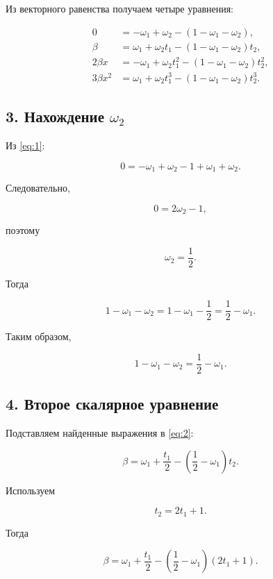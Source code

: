 \documentclass[a4paper,12pt]{article}
\begin{document}
	Из векторного равенства получаем четыре уравнения:
	
	\begin{align}
		0
		&=
		-\omega_1+\omega_2-(1-\omega_1-\omega_2),
		\label{eq:1}\\
		\beta
		&=
		\omega_1+\omega_2t_1
		-(1-\omega_1-\omega_2)t_2,
		\label{eq:2}\\
		2\beta x
		&=
		-\omega_1+\omega_2t_1^2
		-(1-\omega_1-\omega_2)t_2^2,
		\label{eq:3}\\
		3\beta x^2
		&=
		\omega_1+\omega_2t_1^3
		-(1-\omega_1-\omega_2)t_2^3.
		\label{eq:4}
	\end{align}
	
	\subsection*{3. Нахождение $\omega_2$}
	
	Из \eqref{eq:1}:
	
	\[
	0
	=
	-\omega_1+\omega_2-1+\omega_1+\omega_2.
	\]
	
	Следовательно,
	
	\[
	0=2\omega_2-1,
	\]
	
	поэтому
	
	\begin{equation}
		\boxed{\omega_2=\frac12}.
	\end{equation}
	
	Тогда
	
	\[
	1-\omega_1-\omega_2
	=
	1-\omega_1-\frac12
	=
	\frac12-\omega_1.
	\]
	
	Таким образом,
	
	\begin{equation}
		\boxed{
			1-\omega_1-\omega_2
			=
			\frac12-\omega_1.
		}
	\end{equation}
	
	\subsection*{4. Второе скалярное уравнение}
	
	Подставляем найденные выражения в \eqref{eq:2}:
	
	\[
	\beta
	=
	\omega_1+\frac{t_1}{2}
	-
	\left(\frac12-\omega_1\right)t_2.
	\]
	
	Используем
	
	\[
	t_2=2t_1+1.
	\]
	
	Тогда
	
	\[
	\beta
	=
	\omega_1+\frac{t_1}{2}
	-
	\left(\frac12-\omega_1\right)(2t_1+1).
	\]
	
\end{document}
